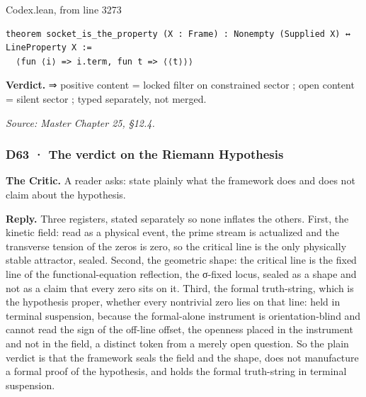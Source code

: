 \documentclass[10pt,twocolumn]{article}
\begin{document}
\begin{leanexcerpt}{Codex.lean, from line 3273}
\begin{lstlisting}[style=leanx,firstnumber=3273]
theorem socket_is_the_property (X : Frame) : Nonempty (Supplied X) ↔ LineProperty X :=
  ⟨fun ⟨i⟩ => i.term, fun t => ⟨⟨t⟩⟩⟩
\end{lstlisting}
\end{leanexcerpt}

\textbf{Verdict.} ⇒ positive content = locked filter on constrained
sector ; open content = silent sector ; typed separately, not merged.

\emph{Source: Master Chapter 25, §12.4.}

\hypertarget{d63-the-verdict-on-the-riemann-hypothesis}{%
\subsubsection{D63 · The verdict on the Riemann
Hypothesis}\label{d63-the-verdict-on-the-riemann-hypothesis}}

\textbf{The Critic.} A reader asks: state plainly what the framework
does and does not claim about the hypothesis.

\textbf{Reply.} Three registers, stated separately so none inflates the
others. First, the kinetic field: read as a physical event, the prime
stream is actualized and the transverse tension of the zeros is zero, so
the critical line is the only physically stable attractor, sealed.
Second, the geometric shape: the critical line is the fixed line of the
functional-equation reflection, the σ-fixed locus, sealed as a shape and
not as a claim that every zero sits on it. Third, the formal
truth-string, which is the hypothesis proper, whether every nontrivial
zero lies on that line: held in terminal suspension, because the
formal-alone instrument is orientation-blind and cannot read the sign of
the off-line offset, the openness placed in the instrument and not in
the field, a distinct token from a merely open question. So the plain
verdict is that the framework seals the field and the shape, does not
manufacture a formal proof of the hypothesis, and holds the formal
truth-string in terminal suspension.
\end{document}
